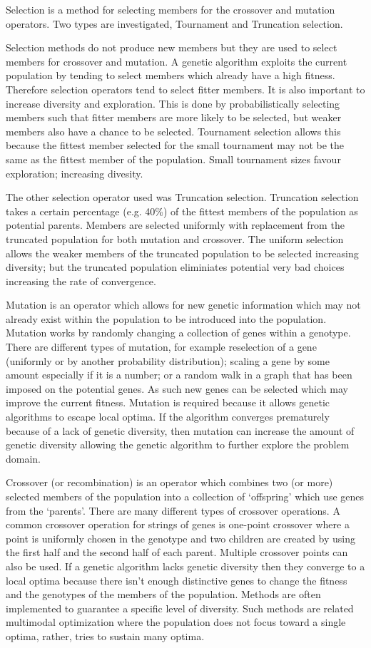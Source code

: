 Selection is a method for selecting members for the crossover and mutation operators. Two types are investigated, Tournament and Truncation selection.

Selection methods do not produce new members but they are used to select members for crossover and mutation. A genetic algorithm exploits the current population by tending to select members which already have a high fitness. Therefore selection operators tend to select fitter members. It is also important to increase diversity and exploration. This is done by probabilistically selecting members such that fitter members are more likely to be selected, but weaker members also have a chance to be selected. Tournament selection allows this because the fittest member selected for the small tournament may not be the same as the fittest member of the population. Small tournament sizes favour exploration; increasing divesity.

The other selection operator used was Truncation selection. Truncation selection takes a certain percentage (e.g. 40\%) of the fittest members of the population as potential parents. Members are selected uniformly with replacement from the truncated population for both mutation and crossover. The uniform selection allows the weaker members of the truncated population to be selected increasing diversity; but the truncated population eliminiates potential very bad choices increasing the rate of convergence.

Mutation is an operator which allows for new genetic information which may not already exist within the population to be introduced into the population. Mutation works by randomly changing a collection of genes within a genotype. There are different types of mutation, for example reselection of a gene (uniformly or by another probability distribution); scaling a gene by some amount especially if it is a number; or a random walk in a graph that has been imposed on the potential genes. As such new genes can be selected which may improve the current fitness. Mutation is required because it allows genetic algorithms to escape local optima. If the algorithm converges prematurely because of a lack of genetic diversity, then mutation can increase the amount of genetic diversity allowing the genetic algorithm to further explore the problem domain.


Crossover (or recombination) is an operator which combines two (or more) selected members of the population into a collection of `offspring' which use genes from the `parents'. There are many different types of crossover operations. A common crossover operation for strings of genes is one-point crossover where a point is uniformly chosen in the genotype and two children are created by using the first half and the second half of each parent. Multiple crossover points can also be used. 
If a genetic algorithm lacks genetic diversity then they converge to a local optima because there isn't enough distinctive genes to change the fitness and the genotypes of the members of the population. Methods are often implemented to guarantee a specific level of diversity. Such methods are related multimodal optimization where the population does not focus toward a single optima, rather, tries to sustain many optima. 

